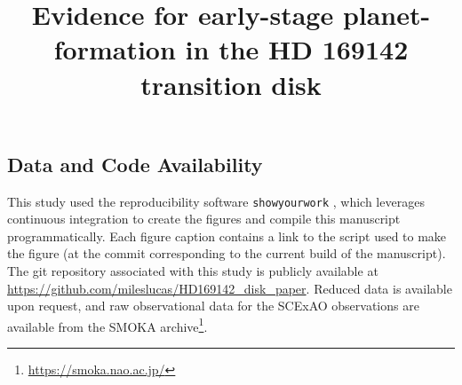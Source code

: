 \documentclass[twocolumn,twocolappendix]{aastex631}
\begin{document}
\begin{CJK*}{UTF8}{gbsn}

\title{Evidence for early-stage planet-formation in the HD 169142 transition disk}



\begin{abstract}
\end{abstract}











\appendix




\section{Data and Code Availability}
This study used the reproducibility software \texttt{showyourwork} \citep{luger_mapping_2021}, which leverages continuous integration to create the figures and compile this manuscript programmatically. Each figure caption contains a link to the script used to make the figure (at the commit corresponding to the current build of the manuscript). The git repository associated with this study is publicly available at \url{https://github.com/mileslucas/HD169142_disk_paper}. Reduced data is available upon request, and raw observational data for the SCExAO observations are available from the SMOKA archive\footnote{\url{https://smoka.nao.ac.jp/}}.


\end{CJK*}
\end{document}
